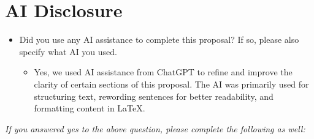 \documentclass[11pt,a4paper]{article}
\begin{document}
\section{AI Disclosure}

\begin{itemize}
    \item Did you use any AI assistance to complete this proposal? If so, please also specify what AI you used.
    \begin{itemize}
        \item Yes, we used AI assistance from ChatGPT to refine and improve the clarity of certain sections of this proposal. The AI was primarily used for structuring text, rewording sentences for better readability, and formatting content in LaTeX.
    \end{itemize}
\end{itemize}

\noindent\textit{If you answered yes to the above question, please complete the following as well:}
\end{document}
